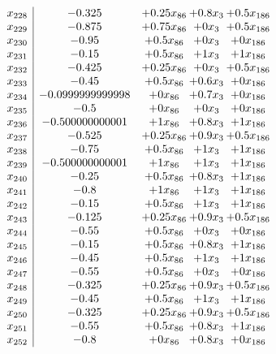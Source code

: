 \documentclass[11pt]{article}
\begin{document}
\[\begin{array}{c| c c@{\hskip 2pt} c@{\hskip 2pt} c@{\hskip 2pt} }
 x_{228}   &  -0.325 & + 0.25 x_{86} & + 0.8 x_{3} & + 0.5 x_{186}\\
 x_{229}   &  -0.875 & + 0.75 x_{86} & + 0 x_{3} & + 0.5 x_{186}\\
 x_{230}   &  -0.95 & + 0.5 x_{86} & + 0 x_{3} & + 0 x_{186}\\
 x_{231}   &  -0.15 & + 0.5 x_{86} & + 1 x_{3} & + 1 x_{186}\\
 x_{232}   &  -0.425 & + 0.25 x_{86} & + 0 x_{3} & + 0.5 x_{186}\\
 x_{233}   &  -0.45 & + 0.5 x_{86} & + 0.6 x_{3} & + 0 x_{186}\\
 x_{234}   &  -0.0999999999998 & + 0 x_{86} & + 0.7 x_{3} & + 0 x_{186}\\
 x_{235}   &  -0.5 & + 0 x_{86} & + 0 x_{3} & + 0 x_{186}\\
 x_{236}   &  -0.500000000001 & + 1 x_{86} & + 0.8 x_{3} & + 1 x_{186}\\
 x_{237}   &  -0.525 & + 0.25 x_{86} & + 0.9 x_{3} & + 0.5 x_{186}\\
 x_{238}   &  -0.75 & + 0.5 x_{86} & + 1 x_{3} & + 1 x_{186}\\
 x_{239}   &  -0.500000000001 & + 1 x_{86} & + 1 x_{3} & + 1 x_{186}\\
 x_{240}   &  -0.25 & + 0.5 x_{86} & + 0.8 x_{3} & + 1 x_{186}\\
 x_{241}   &  -0.8 & + 1 x_{86} & + 1 x_{3} & + 1 x_{186}\\
 x_{242}   &  -0.15 & + 0.5 x_{86} & + 1 x_{3} & + 1 x_{186}\\
 x_{243}   &  -0.125 & + 0.25 x_{86} & + 0.9 x_{3} & + 0.5 x_{186}\\
 x_{244}   &  -0.55 & + 0.5 x_{86} & + 0 x_{3} & + 0 x_{186}\\
 x_{245}   &  -0.15 & + 0.5 x_{86} & + 0.8 x_{3} & + 1 x_{186}\\
 x_{246}   &  -0.45 & + 0.5 x_{86} & + 1 x_{3} & + 1 x_{186}\\
 x_{247}   &  -0.55 & + 0.5 x_{86} & + 0 x_{3} & + 0 x_{186}\\
 x_{248}   &  -0.325 & + 0.25 x_{86} & + 0.9 x_{3} & + 0.5 x_{186}\\
 x_{249}   &  -0.45 & + 0.5 x_{86} & + 1 x_{3} & + 1 x_{186}\\
 x_{250}   &  -0.325 & + 0.25 x_{86} & + 0.9 x_{3} & + 0.5 x_{186}\\
 x_{251}   &  -0.55 & + 0.5 x_{86} & + 0.8 x_{3} & + 1 x_{186}\\
 x_{252}   &  -0.8 & + 0 x_{86} & + 0.8 x_{3} & + 0 x_{186}\\

\end{array}\]
\end{document}
